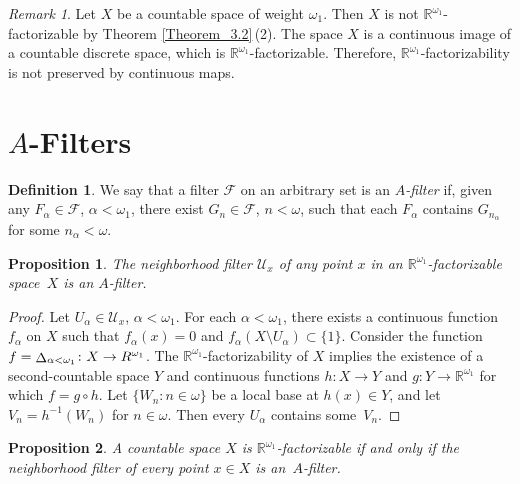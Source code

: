 \documentclass[a4paper,12pt]{amsart}
\newtheorem{proposition}{Proposition}[section]
\theoremstyle{definition}
\newtheorem{definition}{Definition}[section]
\theoremstyle{remark}
\newtheorem{remark}{Remark}[section]
\def\diag{\operatornamewithlimits{%
  \mathchoice{\vcenter{\hbox{$\Delta$}}}
             {\vcenter{\hbox{$\Delta$}}}
             {\Delta}
             {\Delta}}}
\begin{document}
\begin{remark}
Let $X$ be a countable space of weight $\omega_1$. Then $X$ is not $\mathbb 
R^{\omega_1}$-factorizable by Theorem \ref{Theorem_3.2}\,(2). The space $X$ is a continuous image of a countable discrete space, which is  
$\mathbb R^{\omega_1}$-factorizable. Therefore, $\mathbb R^{\omega_1}$-factorizability is not preserved by 
continuous maps. 
\end{remark}


\section{$A$-Filters}

\begin{definition}
We say that a filter $\mathscr F$ on an arbitrary set is an \emph{$A$-filter} if, given any 
$F_\alpha\in \mathscr F$, $\alpha<\omega_1$, there exist $G_n\in \mathscr F$, $n<\omega$, such that 
each $F_\alpha$ contains $G_{n_\alpha}$ for some $n_\alpha<\omega$. 
\end{definition}

\begin{proposition} 
\label{Proposition_4.1}
The neighborhood filter $\mathscr U_x$ of any point $x$ in an $\mathbb R^{\omega_1}$-factorizable space~$X$ 
is an $A$-filter.
\end{proposition}

\begin{proof}
Let $U_\alpha\in \mathscr U_x$, $\alpha<\omega_1$.
For each $\alpha<\omega_1$, there exists a  continuous function $f_\alpha$ on $X$ such that 
$f_\alpha(x)=0$ and $f_\alpha(X\setminus U_\alpha)\subset\{1\}$.
Consider the function $f=\diag_{\alpha<\omega_1}\colon X\to R^{\omega_1}$. The 
$\mathbb R^{\omega_1}$-factorizability of $X$ implies the existence of a second-countable space $Y$ and 
continuous functions $h\colon X \to Y$ and $g\colon Y\to \mathbb R^{\omega_1}$ 
for which $f = g \circ h$.
Let $\{W_n:n\in\omega\}$ be a local base at $h(x)\in Y$, and let $V_n=h^{-1}(W_n)$ for $n\in\omega$.
Then every $U_\alpha$ contains some~$V_n$.
\end{proof}

\begin{proposition}
\label{Proposition_4.2}
A countable space $X$ 
is $\mathbb R^{\omega_1}$-factorizable if and only if 
the neighborhood filter of every point $x\in X$ is an~$A$-filter. 
\end{proposition}
\end{document}
